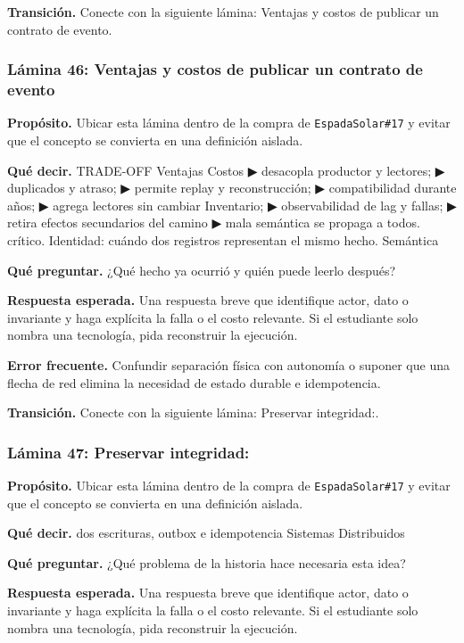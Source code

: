 \documentclass[variant=docente,cover=institutional,mode=screen]{ua-engineering-v6-article}
\begin{document}
\textbf{Transición.} Conecte con la siguiente lámina: Ventajas y costos de publicar un contrato de evento.

\subsubsection*{Lámina 46: Ventajas y costos de publicar un contrato de evento}
\textbf{Propósito.} Ubicar esta lámina dentro de la compra de \texttt{EspadaSolar\#17} y evitar que el concepto se convierta en una definición aislada.

\textbf{Qué decir.} TRADE-OFF Ventajas Costos ▶ desacopla productor y lectores; ▶ duplicados y atraso; ▶ permite replay y reconstrucción; ▶ compatibilidad durante años; ▶ agrega lectores sin cambiar Inventario; ▶ observabilidad de lag y fallas; ▶ retira efectos secundarios del camino ▶ mala semántica se propaga a todos. crítico. Identidad: cuándo dos registros representan el mismo hecho. Semántica

\textbf{Qué preguntar.} ¿Qué hecho ya ocurrió y quién puede leerlo después?

\textbf{Respuesta esperada.} Una respuesta breve que identifique actor, dato o invariante y haga explícita la falla o el costo relevante. Si el estudiante solo nombra una tecnología, pida reconstruir la ejecución.

\textbf{Error frecuente.} Confundir separación física con autonomía o suponer que una flecha de red elimina la necesidad de estado durable e idempotencia.

\textbf{Transición.} Conecte con la siguiente lámina: Preservar integridad:.

\subsubsection*{Lámina 47: Preservar integridad:}
\textbf{Propósito.} Ubicar esta lámina dentro de la compra de \texttt{EspadaSolar\#17} y evitar que el concepto se convierta en una definición aislada.

\textbf{Qué decir.} dos escrituras, outbox e idempotencia Sistemas Distribuidos

\textbf{Qué preguntar.} ¿Qué problema de la historia hace necesaria esta idea?

\textbf{Respuesta esperada.} Una respuesta breve que identifique actor, dato o invariante y haga explícita la falla o el costo relevante. Si el estudiante solo nombra una tecnología, pida reconstruir la ejecución.
\end{document}
